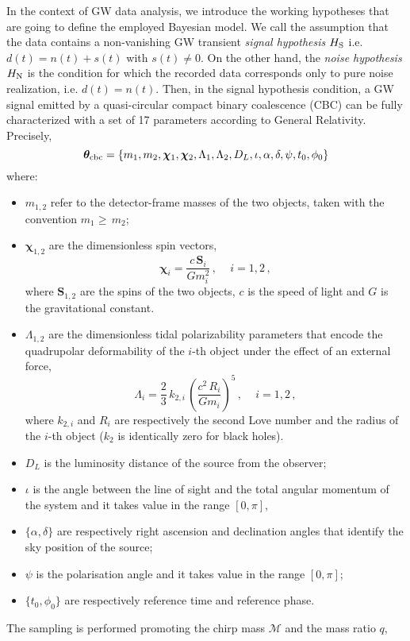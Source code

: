 \documentclass[prd,aps,twocolumn,a4paper,showkeys,nofootinbib,floatfix]{revtex4-1}
\newcommand{\be}{\begin{equation}}
\newcommand{\ee}{\end{equation}}
\def\M{\mathcal{M}}
\def\params{\boldsymbol{\theta}}
\def\spin{\boldsymbol{\chi}}
\begin{document}
In the context of GW data analysis,
we introduce the working hypotheses 
that are going to define the employed Bayesian model.
We call the assumption that the data contains a 
non-vanishing GW transient {\it signal hypothesis} $H_{\rm S}$
i.e. $d(t)=n(t)+s(t)$ with $s(t)\ne 0$.
On the other hand, the {\it noise hypothesis} $H_{\rm N}$ is the condition
for which the recorded data corresponds only to pure noise realization, i.e. $d(t)=n(t)$.
Then, in the signal hypothesis condition,
a GW signal emitted by a quasi-circular compact binary coalescence (CBC)
can be fully characterized with a set of 17 parameters according to General 
Relativity. Precisely,
\be
\label{eq:gwparams}
\params_{\rm cbc} = \{ m_1, m_2, \spin_1 , \spin_2, \Lambda_1, \Lambda_2,
									D_L, \iota, \alpha, \delta, \psi, t_0, \phi_0\}
\ee
where: 
\begin{itemize}
\item $m_{1,2}$ refer to the detector-frame masses of the two objects, 
taken with the convention $m_1{\ge} \,m_2$;
\item $\spin_{1,2}$ are the dimensionless spin vectors,
\be
\label{eq:chii}
\spin_{i}=\frac{c\, \textbf{S}_{i}}{Gm_{i}^2}\,,\quad  \,i=1,2\,,
\ee
where $\textbf{S}_{1,2}$ are the spins of the two objects,
 $c$ is the speed of light and $G$ is the gravitational constant.
\item $\Lambda_{1,2}$ are the dimensionless tidal polarizability parameters
that encode the quadrupolar deformability of the $i$-th object under the effect of an external force,
\be
\label{eq:lambdai}
\Lambda_{i}=\frac{2}{3}\,k_{2,i}\,\left(\frac{c^2\, R_{i}}{Gm_{i}}\right)^5\,,\quad  \,i=1,2\,,
\ee
where $k_{2,i}$ and $R_i$ are respectively the second Love number and the radius of the $i$-th object
($k_2$ is identically zero for black holes).
\item $D_L$ is the luminosity distance of the source from the observer;
\item $\iota$ is the angle between the line of sight and the total angular momentum of the system and it takes value in the range $[0,\pi]$,
\item $\{\alpha,\delta\}$ are respectively 
right ascension and declination angles that identify the sky position of the source;
\item $\psi$ is the polarisation angle and it takes value in the range $[0,\pi]$;
\item $\{t_0, \phi_0\}$ are respectively reference time and reference phase.
\end{itemize}
The sampling is performed promoting the chirp mass $\M$ and the mass ratio $q$,
\end{document}
